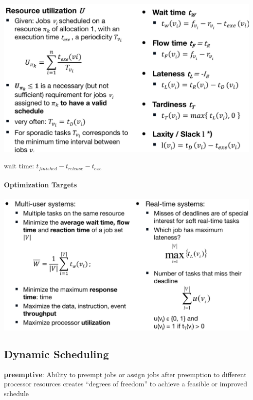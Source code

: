 \documentclass[english]{latex4ei/latex4ei_sheet}
\begin{document}
\begin{center}
  \centering
  \includegraphics[width=\linewidth]{assets/SchedulingTimingMetrics.png}
  \label{fig:schedulingtimingmetrics}
\end{center}

wait time: $t_{finished} - t_{release} - t_{exe}$

\paragraph{Optimization Targets}

\begin{center}
  \centering
  \includegraphics[width=\linewidth]{assets/OptimizationTargets.png}
  \label{fig:optimizationtargets}
\end{center}


\subsection{Dynamic Scheduling}

\textbf{preemptive}: Ability to preempt jobs or assign jobs after preemption to different processor resources creates “degrees of freedom” to achieve a feasible or improved schedule
\end{document}
